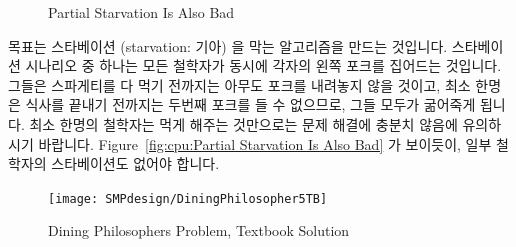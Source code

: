 \begin{figure}[tb]
\centering
{}
\caption{Partial Starvation Is Also Bad}
\end{figure}

목표는 스타베이션 (starvation: 기아) 을 막는 알고리즘을 만드는 것입니다.
스타베이션 시나리오 중 하나는 모든 철학자가 동시에 각자의 왼쪽 포크를 집어드는
것입니다.
그들은 스파게티를 다 먹기 전까지는 아무도 포크를 내려놓지 않을 것이고, 최소
한명은 식사를 끝내기 전까지는 두번째 포크를 들 수 없으므로, 그들 모두가
굶어죽게 됩니다.
최소 한명의 철학자는 먹게 해주는 것만으로는 문제 해결에 충분치 않음에
유의하시기 바랍니다.
Figure~\ref{fig:cpu:Partial Starvation Is Also Bad} 가 보이듯이, 일부 철학자의
스타베이션도 없어야 합니다.

\begin{figure}[tb]
\centering
\texttt{[image: SMPdesign/DiningPhilosopher5TB]}
\caption{Dining Philosophers Problem, Textbook Solution}
\end{figure}

